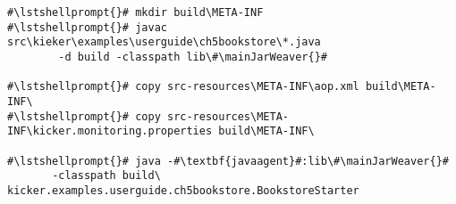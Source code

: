 \begin{lstlisting}[caption=Commands to compile and run the annotated Bookstore under Windows, label=lst:traceAnalysisCompileRunExample1Win]
#\lstshellprompt{}# mkdir build\META-INF
#\lstshellprompt{}# javac src\kieker\examples\userguide\ch5bookstore\*.java
        -d build -classpath lib\#\mainJarWeaver{}#

#\lstshellprompt{}# copy src-resources\META-INF\aop.xml build\META-INF\
#\lstshellprompt{}# copy src-resources\META-INF\kicker.monitoring.properties build\META-INF\

#\lstshellprompt{}# java -#\textbf{javaagent}#:lib\#\mainJarWeaver{}#
       -classpath build\ kicker.examples.userguide.ch5bookstore.BookstoreStarter
\end{lstlisting}
